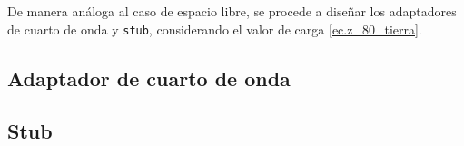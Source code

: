 De manera análoga al caso de espacio libre, se procede a diseñar los adaptadores de cuarto de onda y \texttt{stub}, considerando el valor de carga \ref{ec.z_80_tierra}.

\subsection{Adaptador de cuarto de onda}



\subsection{Stub}

